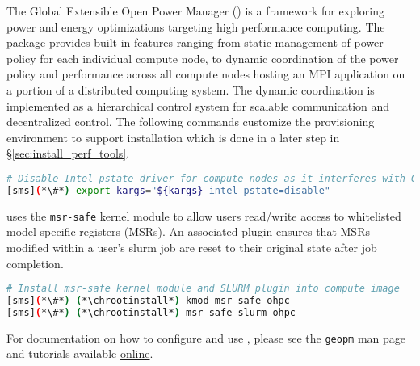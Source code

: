 The Global Extensible Open Power Manager (\GEOPM{}) is a framework for
exploring power and energy optimizations targeting high performance computing.
The \GEOPM{} package provides built-in features ranging from static management
of power policy for each individual compute node, to dynamic coordination of
the power policy and performance across all compute nodes hosting an MPI
application on a portion of a distributed computing system.  The dynamic
coordination is implemented as a hierarchical control system for scalable
communication and decentralized control. The following commands customize the
provisioning environment to support \GEOPM{} installation which is done in a
later step in \S\ref{sec:install_perf_tools}.

\begin{lstlisting}[language=bash,keywords={},upquote=true]
# Disable Intel pstate driver for compute nodes as it interferes with GEOPM's operation.
[sms](*\#*) export kargs="${kargs} intel_pstate=disable"
\end{lstlisting}

\noindent \GEOPM{} uses the \texttt{msr-safe} kernel module
to allow users read/write access to whitelisted model specific
registers (MSRs).  An associated \SLURM{} plugin ensures that MSRs modified
within a user's slurm job are reset to their original state after job completion.

\begin{lstlisting}[language=bash,keywords={},upquote=true]
# Install msr-safe kernel module and SLURM plugin into compute image
[sms](*\#*) (*\chrootinstall*) kmod-msr-safe-ohpc
[sms](*\#*) (*\chrootinstall*) msr-safe-slurm-ohpc
\end{lstlisting}

\noindent For documentation on how to configure and use \GEOPM{}, please see
the \texttt{geopm} man page and tutorials
available \href{https://github.com/geopm/geopm/tree/dev/tutorial}{online}.

